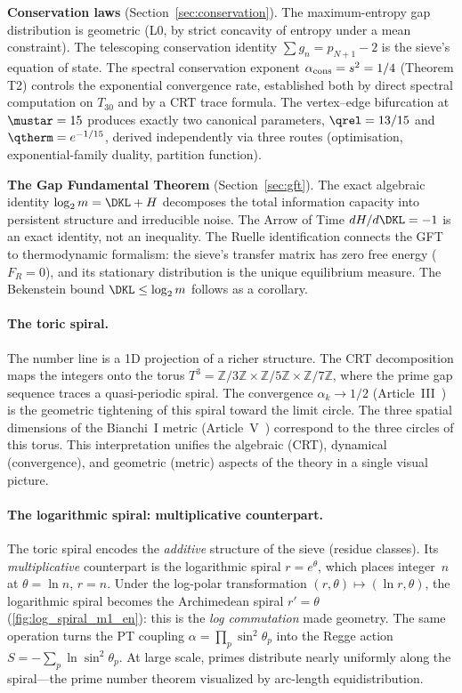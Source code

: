 \documentclass[12pt,a4paper]{article}
\begin{document}
\textbf{Conservation laws} (Section~\ref{sec:conservation}).
The maximum-entropy gap distribution is geometric (L0, by strict
concavity of entropy under a mean constraint).  The telescoping
conservation identity $\sum g_n = p_{N+1} - 2$ is the sieve's equation
of state.  The spectral conservation exponent $\alpha_{\rm cons} =
s^2 = 1/4$ (Theorem T2) controls the exponential convergence rate,
established both by direct spectral computation on $T_{30}$ and by a
CRT trace formula.  The vertex--edge bifurcation at $\mustar = 15$
produces exactly two canonical parameters, $\qrel = 13/15$ and
$\qtherm = e^{-1/15}$, derived independently via three routes
(optimisation, exponential-family duality, partition function).

\textbf{The Gap Fundamental Theorem} (Section~\ref{sec:gft}).
The exact algebraic identity $\log_2 m = \DKL + H$ decomposes the
total information capacity into persistent structure and irreducible
noise.  The Arrow of Time $dH/d\DKL = -1$ is an exact identity, not
an inequality.  The Ruelle identification connects the GFT to
thermodynamic formalism: the sieve's transfer matrix has zero free
energy ($F_R = 0$), and its stationary distribution is the unique
equilibrium measure.  The Bekenstein bound $\DKL \leq \log_2 m$
follows as a corollary.

\paragraph{The toric spiral.}
The number line is a 1D projection of a richer structure.
The CRT decomposition maps the integers onto the torus
$T^3 = \mathbb{Z}/3\mathbb{Z} \times \mathbb{Z}/5\mathbb{Z} \times
\mathbb{Z}/7\mathbb{Z}$, where the prime gap sequence traces a
quasi-periodic spiral.  The convergence $\alpha_k \to 1/2$
(Article~III~\cite{companion_M3}) is the geometric tightening of this
spiral toward the limit circle.  The three spatial dimensions of the
Bianchi~I metric (Article~V~\cite{companion_M5}) correspond to the
three circles of this torus.  This interpretation unifies the
algebraic (CRT), dynamical (convergence), and geometric (metric)
aspects of the theory in a single visual picture.

\paragraph{The logarithmic spiral: multiplicative counterpart.}
The toric spiral encodes the \emph{additive} structure of the sieve
(residue classes). Its \emph{multiplicative} counterpart is the
logarithmic spiral $r = e^{\theta}$, which places integer~$n$ at
$\theta = \ln n$, $r = n$. Under the log-polar transformation
$(r, \theta) \mapsto (\ln r, \theta)$, the logarithmic spiral becomes
the Archimedean spiral $r' = \theta$ (\cref{fig:log_spiral_m1_en}):
this is the \emph{log commutation} made geometry. The same operation
turns the PT coupling $\alpha = \prod_p \sin^2 \theta_p$ into the
Regge action $S = -\sum_p \ln \sin^2 \theta_p$. At large scale,
primes distribute nearly uniformly along the spiral---the prime
number theorem visualized by arc-length equidistribution.
\end{document}
